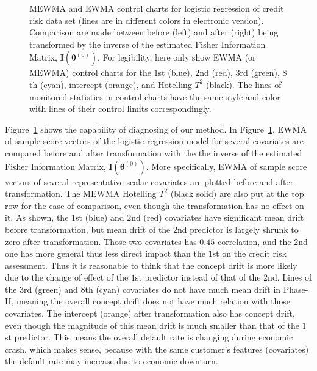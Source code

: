 \documentclass[twoside,11pt]{article}
\begin{document}
\begin{figure}[!htbp]
  \caption{
  MEWMA and EWMA control charts for logistic regression of credit risk data set (lines are in different colors in electronic version). Comparison are made between before (left) and after (right) being transformed by the inverse of the estimated Fisher Information Matrix, $\mathbf {I} ( {\bm{\theta}} ^{(0)})$. For legibility, here only show EWMA (or MEWMA) control charts for the $1$st (blue), $2$nd (red), $3$rd (green), $8$th (cyan), intercept (orange), and Hotelling $T^2$ (black). The lines of monitored statistics in control charts have the same style and color with lines of their control limits correspondingly.
}
\label{fig:credit_default_diag}
\end{figure}

Figure~\ref{fig:credit_default_diag} shows the capability of diagnosing of our method. In Figure~\ref{fig:credit_default_diag}, EWMA of sample score vectors of the logistic regression model for several covariates are compared before and after transformation with the the inverse of the estimated Fisher Information Matrix, $\mathbf {I} ( {\bm{\theta}} ^{(0)})$. More specifically, EWMA of sample score vectors of several representative scalar covariates are plotted before and after transformation. The MEWMA Hotelling $T^2$ (black solid) are also put at the top row for the ease of comparison, even though the transformation has no effect on it. As shown, the $1$st (blue) and $2$nd (red) covariates have significant mean drift before transformation, but mean drift of the $2$nd predictor is largely shrunk to zero after transformation. Those two covariates has $0.45$ correlation, and the $2$nd one has more general thus less direct impact than the $1$st on the credit risk assessment. Thus it is reasonable to think that the concept drift is more likely due to the change of effect of the $1$st predictor instead of that of the $2$nd. Lines of the $3$rd (green) and $8$th (cyan) covariates do not have much mean drift in Phase-II, meaning the overall concept drift does not have much relation with those covariates. The intercept (orange) after transformation also has concept drift, even though the magnitude of this mean drift is much smaller than that of the $1$st predictor. This means the overall default rate is changing during economic crash, which makes sense, because with the same customer's features (covariates) the default rate may increase due to economic downturn. 
\end{document}
